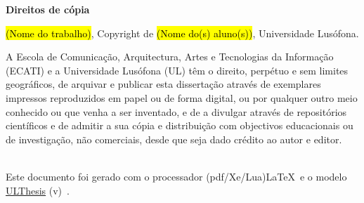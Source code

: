 \thispagestyle{plain}

\vspace*{\fill}

\begin{flushleft}
\rmfamily
{\fontsize{14}{1.15}\selectfont
    \textbf{Direitos de cópia}
}
\vspace{2\baselineskip}

\normalsize{\hl{(Nome do trabalho)}, Copyright de \hl{(Nome do(s) aluno(s))}, Universidade Lusófona.

A Escola de Comunicação, Arquitectura, Artes e Tecnologias da Informação (ECATI) e a Universidade Lusófona (UL) têm o direito, perpétuo e sem limites geográficos, de arquivar e publicar esta dissertação através de exemplares impressos reproduzidos em papel ou de forma digital, ou por qualquer outro meio conhecido ou que venha a ser inventado, e de a divulgar através de repositórios científicos e de admitir a sua cópia e distribuição com objectivos educacionais ou de investigação, não comerciais, desde que seja dado crédito ao autor e editor.}\\
Este documento foi gerado com o processador (pdf/Xe/Lua)\LaTeX\ e o modelo \href{https://github.com/joaomlourenco/novathesis}{ULThesis} (v\ulthesisversion)~\cite{ulthesis-manual}.
\end{flushleft}